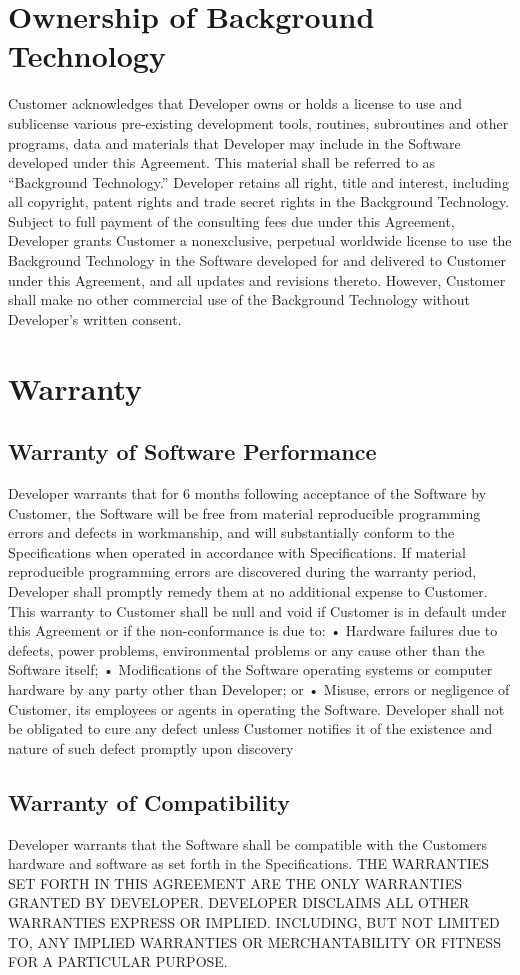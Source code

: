 \documentclass{article}
\begin{document}
\section{Ownership of Background Technology}
Customer acknowledges that Developer owns or holds a license to use and sublicense various pre-existing development tools, routines, subroutines and other programs, data and materials that Developer may include in the Software developed under this Agreement. This material shall be referred to as “Background Technology.” 
Developer retains all right, title and interest, including all copyright, patent rights and trade secret rights in the Background Technology. Subject to full payment of the consulting fees due under this Agreement, Developer grants Customer a nonexclusive, perpetual worldwide license to use the Background Technology in the Software developed for and delivered to Customer under this Agreement, and all updates and revisions thereto. However, Customer shall make no other commercial use of the Background Technology without Developer’s written consent.
\section{Warranty}
\subsection{Warranty of Software Performance}
Developer warrants that for 6 months following acceptance of the Software by Customer, the Software will be free from material reproducible programming errors and defects in workmanship, and will substantially conform to the Specifications when operated in accordance with Specifications. If material reproducible programming errors are discovered during the warranty period, Developer shall promptly remedy them at no additional expense to Customer. This warranty to Customer shall be null and void if Customer is in default under this Agreement or if the non-conformance is due to:
•	Hardware failures due to defects, power problems, environmental problems or any cause other than the Software itself;
•	Modifications of the Software operating systems or computer hardware by any party other than Developer; or
•	Misuse, errors or negligence of Customer, its employees or agents in operating the Software. Developer shall not be obligated to cure any defect unless Customer notifies it of the existence and nature of such defect promptly upon discovery

\subsection{Warranty of Compatibility}
Developer warrants that the Software shall be compatible with the Customers hardware and software as set forth in the Specifications.
THE WARRANTIES SET FORTH IN THIS AGREEMENT ARE THE ONLY WARRANTIES GRANTED BY DEVELOPER. DEVELOPER DISCLAIMS ALL OTHER WARRANTIES EXPRESS OR IMPLIED. INCLUDING, BUT NOT LIMITED TO, ANY IMPLIED WARRANTIES OR MERCHANTABILITY OR FITNESS FOR A PARTICULAR PURPOSE.
\end{document}
